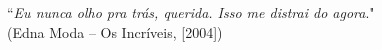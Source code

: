 \begin{epigrafe}
    \vspace*{\fill}
{%
    \noindent\hspace{.5\textwidth}
    {\begin{minipage}{.5\textwidth}
            ``\textit{Eu nunca olho pra trás, querida. Isso me distrai do agora}." \\(Edna Moda {--} Os Incríveis, [2004])
    \end{minipage}}%
    \vspace*{3cm}
}%
\end{epigrafe}
